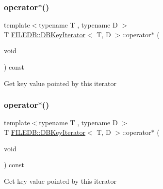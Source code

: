 \subsubsection{\texorpdfstring{operator$\ast$()}{operator*()}\hspace{0.1cm}{\footnotesize\ttfamily [1/2]}}
{\footnotesize\ttfamily template$<$typename T , typename D $>$ \\
T \mbox{\hyperlink{classFILEDB_1_1DBKeyIterator}{F\+I\+L\+E\+D\+B\+::\+D\+B\+Key\+Iterator}}$<$ T, D $>$\+::operator$\ast$ (\begin{DoxyParamCaption}\item[{void}]{ }\end{DoxyParamCaption}) const\hspace{0.3cm}{\ttfamily [inline]}}

Get key value pointed by this iterator \mbox{\label{classFILEDB_1_1DBKeyIterator_ab3cfba3f2b19b6eb74ff614c62195ab4}} 
\subsubsection{\texorpdfstring{operator$\ast$()}{operator*()}\hspace{0.1cm}{\footnotesize\ttfamily [2/2]}}
{\footnotesize\ttfamily template$<$typename T , typename D $>$ \\
T \mbox{\hyperlink{classFILEDB_1_1DBKeyIterator}{F\+I\+L\+E\+D\+B\+::\+D\+B\+Key\+Iterator}}$<$ T, D $>$\+::operator$\ast$ (\begin{DoxyParamCaption}\item[{void}]{ }\end{DoxyParamCaption}) const\hspace{0.3cm}{\ttfamily [inline]}}

Get key value pointed by this iterator \mbox{\label{classFILEDB_1_1DBKeyIterator_a7816155cac741f3f82dafa73028f4307}} 
